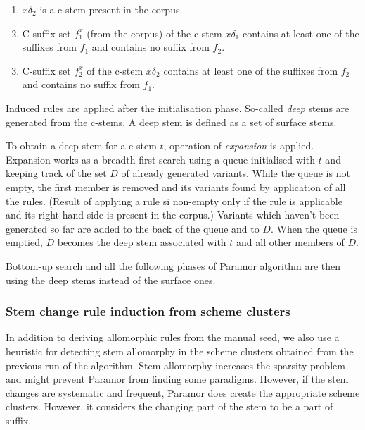 \documentclass{itatnew}
\newcommand{\todojd}[1]{} %
\begin{document}
\begin{enumerate}
\item $x\delta_2$ is a c-stem present in the corpus.
\item C-suffix set $f^x_1$ (from the corpus) of the c-stem $x\delta_1$ contains at least one of the suffixes from $f_1$ and contains no suffix from $f_2$.
\item C-suffix set $f^x_2$ of the c-stem $x\delta_2$ contains at least one of the suffixes from $f_2$ and contains no suffix from $f_1$.
\end{enumerate}

\noindent
Induced rules are applied after the initialisation phase. So-called \emph{deep} stems are generated from the c-stems. A deep stem is defined as a set of surface stems.

To obtain a deep stem for a c-stem $t$, operation of \emph{expansion} is applied. Expansion works as a breadth-first search using a queue initialised with $t$ and keeping track of the set $D$ of already generated variants. While the queue is not empty, the first member is removed and its variants found by application of all the rules. (Result of applying a rule si non-empty only if the rule is applicable and its right hand side is present in the corpus.) Variants which haven't been generated so far are added to the back of the queue and to $D$. When the queue is emptied, $D$ becomes the deep stem associated with $t$ and all other members of $D$. \todojd{Any reason why? Why not keep the deep stem ambiguous? This roughly means that rules are obligatory (If I can produce another allomorph, I have to). Some example, possibly mention where it helps and where it hurts. \textbf{RK:} No special reason for that. I may try an experiment where i keep the `surface' stems }

Bottom-up search and all the following phases of Paramor algorithm are then using the deep stems instead of the surface ones.

\subsubsection{Stem change rule induction from scheme clusters}
\label{sec:autoseed}

\noindent
In addition to deriving allomorphic rules from the manual seed, we also use a heuristic for detecting stem allomorphy in the scheme clusters obtained from the previous run of the algorithm.
%
Stem allomorphy increases the sparsity problem and might prevent Paramor from finding some paradigms. However, if the stem changes are systematic and frequent, Paramor does create the appropriate scheme clusters. However, it considers the changing part of the stem to be a part of suffix.
\end{document}
